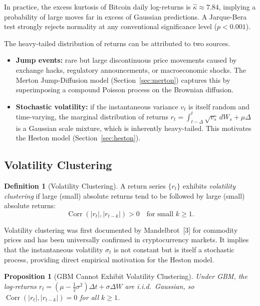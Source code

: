 \documentclass[12pt, a4paper, oneside]{report}
\theoremstyle{plain}
\newtheorem{proposition}[theorem]{Proposition}
\theoremstyle{definition}
\newtheorem{definition}[theorem]{Definition}
\theoremstyle{remark}
\begin{document}
In practice, the excess kurtosis of Bitcoin daily log-returns is
$\hat{\kappa} \approx 7.84$, implying a probability of large moves far in
excess of Gaussian predictions.  A Jarque-Bera test strongly rejects normality
at any conventional significance level ($p < 0.001$).

The heavy-tailed distribution of returns can be attributed to two sources.

\begin{itemize}[leftmargin=1.25cm]
  \item \textbf{Jump events:} rare but large discontinuous price movements caused
    by exchange hacks, regulatory announcements, or macroeconomic shocks.  The Merton
    Jump-Diffusion model (Section~\ref{sec:merton}) captures this by superimposing a
    compound Poisson process on the Brownian diffusion.
  \item \textbf{Stochastic volatility:} if the instantaneous variance $v_t$ is itself
    random and time-varying, the marginal distribution of returns
    $r_t = \int_{t-\Delta}^t \sqrt{v_s}\,dW_s + \mu\Delta$ is a Gaussian scale mixture,
    which is inherently heavy-tailed.  This motivates the Heston model (Section~\ref{sec:heston}).
\end{itemize}

\subsection{Volatility Clustering}

\begin{definition}[Volatility Clustering]
A return series $\{r_t\}$ exhibits \emph{volatility clustering} if large (small)
absolute returns tend to be followed by large (small) absolute returns:
\[
  \operatorname{Corr}(|r_t|, |r_{t-k}|) > 0 \quad \text{for small } k \geq 1.
\]
\end{definition}

Volatility clustering was first documented by Mandelbrot~[3] for commodity prices and
has been universally confirmed in cryptocurrency markets.  It implies that the
instantaneous volatility $\sigma_t$ is not constant but is itself a stochastic process,
providing direct empirical motivation for the Heston model.

\begin{proposition}[GBM Cannot Exhibit Volatility Clustering]
Under GBM, the log-returns $r_t = (\mu - \frac{1}{2}\sigma^2)\Delta t + \sigma\Delta W$
are i.i.d.\ Gaussian, so $\operatorname{Corr}(|r_t|, |r_{t-k}|) = 0$ for all
$k \geq 1$.
\end{proposition}
\end{document}
